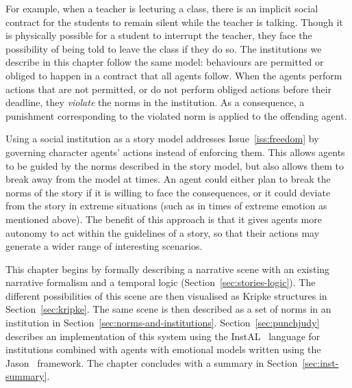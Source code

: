 \documentclass[11pt]{report}
\begin{document}
For example, when a teacher is
lecturing a class, there is an implicit social contract for the students to
remain silent while the teacher is talking. Though it is physically possible for
a student to interrupt the teacher, they face the possibility of being told to
leave the class if they do so. The institutions we describe in this chapter
follow the same model: behaviours are permitted or obliged to happen in a
contract that all agents follow. When the agents perform actions that are not
permitted, or do not perform obliged actions before their deadline, they
\emph{violate} the norms in the institution. As a consequence, a punishment
corresponding to the violated norm is applied to the offending agent.

Using a social institution as a story model addresses Issue~\ref{iss:freedom} by
governing character agents' actions instead of enforcing them. This allows
agents to be guided by the norms described in the
story model, but also allows them to break away from the model at times. An
agent could either plan to break the norms of the story if it is willing to face
the consequences, or it could deviate from the story in extreme situations (such
as in times of extreme emotion as mentioned above). The benefit of this approach
is that it gives agents more autonomy to act within the guidelines of a story,
so that their actions may generate a wider range of interesting scenarios.

This chapter begins by formally describing a narrative scene with an
existing narrative formalism and a temporal logic
(Section~\ref{sec:stories-logic}). The different possibilities of this scene are
then visualised as Kripke structures in Section~\ref{sec:kripke}. The same scene
is then described as a set of norms in an institution in
Section~\ref{sec:norms-and-institutions}. Section~\ref{sec:punchjudy} describes
an implementation of this system using the InstAL~\citep{cliffe2007specifying} language for institutions
combined with agents with emotional models written using the
Jason~\citep{bordini2007programming} framework. The chapter concludes with a
summary in Section~\ref{sec:inst-summary}.
\end{document}
